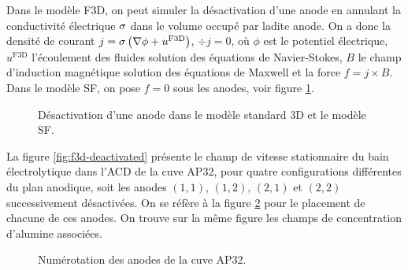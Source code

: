 Dans le modèle F3D, on peut simuler la désactivation d'une anode en
annulant la conductivité électrique $\sigma$ dans le volume
occupé par ladite anode. On a donc la densité de courant $j =
\sigma\left( \nabla \phi + u^\mathrm{F3D} \right)$, $\div j = 0$,
où $\phi$ est le potentiel électrique, $u^\mathrm{F3D}$
l'écoulement des fluides solution des équations de Navier-Stokes,
$B$ le champ d'induction magnétique solution des équations de
Maxwell et la force $f = j\times B$. Dans le modèle SF, on pose $f =
0$ sous les anodes, voir figure \ref{fig:anode-deactivation}.

\begin{figure}
  \begin{center}
    \caption{Désactivation d'une anode dans le modèle standard 3D et
      le modèle SF.}
    \label{fig:anode-deactivation}
  \end{center}
\end{figure}
La figure \ref{fig:f3d-deactivated} présente
le champ de vitesse stationnaire du bain électrolytique dans l'ACD de
la cuve AP32, pour quatre configurations différentes du plan
anodique, soit les anodes $(1,1)$, $(1,2)$, $(2,1)$ et $(2,2)$
successivement désactivées. On se réfère à la figure
\ref{fig:anode-numerotations} pour le placement de chacune de ces anodes. On
trouve sur la même figure les champs de concentration d'alumine
associées.

\begin{figure}
  \begin{center}
    
    \caption{Numérotation des anodes de la cuve AP32.}
    \label{fig:anode-numerotations}
  \end{center}
\end{figure}

